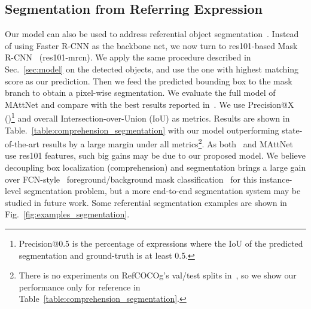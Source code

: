 \subsection{Segmentation from Referring Expression}\label{sec:segmentation}
\vspace{-.2cm}
Our model can also be used to address referential object segmentation~\cite{hu2016segmentation,liu2017recurrent}.
Instead of using Faster R-CNN as the backbone net, we now turn to res101-based Mask R-CNN~\cite{he2017mask} (res101-mrcn).
We apply the same procedure described in Sec.~\ref{sec:model} on the detected objects, and use the one with highest matching score as our prediction.
Then we feed the predicted bounding box to the mask branch to obtain a pixel-wise segmentation.
We evaluate the full model of MAttNet and compare with the best results reported in~\cite{liu2017recurrent}.
We use Precision@X ()\footnote{Precision@0.5 is the percentage of expressions where the IoU of the predicted segmentation and ground-truth is at least 0.5.} and overall Intersection-over-Union (IoU) as metrics.
Results are shown in Table.~\ref{table:comprehension_segmentation} with our model outperforming state-of-the-art results by a large margin under all metrics\footnote{There is no experiments on RefCOCOg's val/test splits in~\cite{liu2017recurrent}, so we show our performance only for reference in Table~\ref{table:comprehension_segmentation}.}.
As both~\cite{liu2017recurrent} and MAttNet use res101 features, such big gains may be due to our proposed model.
We believe decoupling box localization (comprehension) and segmentation brings a large gain over FCN-style~\cite{long2015fully} foreground/background mask classification~\cite{hu2016segmentation,liu2017recurrent} for this instance-level segmentation problem, but a more end-to-end segmentation system may be studied in future work.
Some referential segmentation examples are shown in Fig.~\ref{fig:examples_segmentation}.



